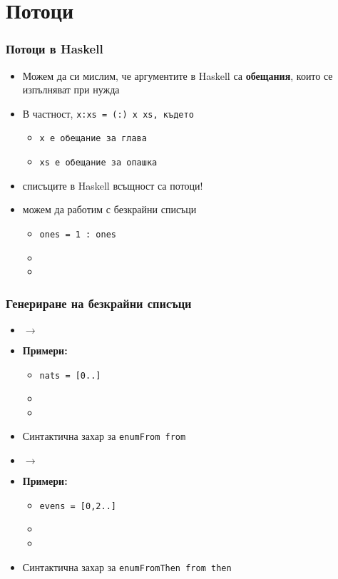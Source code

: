 \documentclass[alsotrans,beameroptions={aspectratio=169}]{beamerswitch}
\begin{document}
\section{Потоци}

\begin{frame}
  \frametitle{Потоци в Haskell}

  \begin{itemize}[<+->]
  \item Можем да си мислим, че аргументите в Haskell са \textbf{обещания}, които се изпълняват при нужда
  \item В частност, \tt{x:xs = (:) x xs}, където
    \begin{itemize}
    \item \tt x е обещание за глава
    \item \tt{xs} е обещание за опашка
    \end{itemize}
  \item \alert{списъците в Haskell всъщност са потоци!}
  \item можем да работим с безкрайни списъци
    \begin{itemize}
    \item \tt{ones = 1 : ones}
    \item {}
    \item {}
    \end{itemize}
  \end{itemize}
\end{frame}

\begin{frame}
  \frametitle{Генериране на безкрайни списъци}

  \begin{itemize}
  \item {} $\rightarrow$ 
  \item \textbf{Примери:}
    \begin{itemize}
    \item \tt{nats = [0..]}
    \item {}
    \item {}
    \end{itemize}
  \item Синтактична захар за \tt{enumFrom from}
    \pause
  \item {} $\rightarrow$ 
  \item \textbf{Примери:}
    \begin{itemize}
    \item \tt{evens = [0,2..]}
    \item {}
    \item {}
    \end{itemize}
  \item Синтактична захар за \tt{enumFromThen from then}
  \end{itemize}
\end{frame}
\end{document}
